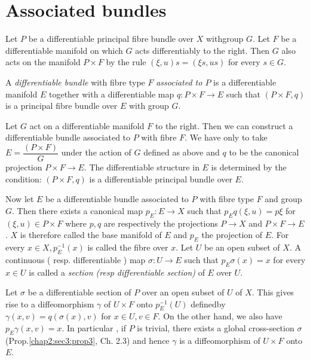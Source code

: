 \section{Associated bundles}\label{chap2:sec6}

Let $P$ be a differentiable principal fibre bundle over $X$
with\pageoriginale group 
$G$. Let $F$ be a differentiable manifold on which $G$ acts
differentiably to the right. Then $G$ also acts on the manifold $P
\times F$ by the rule $(\xi, u) s = (\xi s, us)$ for every $s \in G$.  

\begin{defn}\label{chap2:sec6:def5} %
  A {\em differentiable bundle } with fibre type $F$ {\em associated
    to $P $ } is a differentiable manifold $E$ together with a
  differentiable map $q : P \times F \to E $  such that $(P \times F,
  q)$ is a principal fibre bundle over $E$ with group $G$.  
\end{defn}

Let $G$ act on a differentiable manifold $F$ to the right. Then we can
construct a differentiable bundle associated to $P$ with fibre $F$.
We have only to take $E = \dfrac{( P \times F)} {G}$ under the action
of $G$ defined as above and $q$ to be the canonical projection $P
\times F \to E$. The differentiable structure in $E$ is determined by
the condition: $(P \times F, q) $ is a differentiable principal bundle
over $E$.  

Now let $E$ be a differentiable bundle associated to $P$ with fibre type
$F$ and group $G$. Then there exists a canonical map $p_E : E \to X$
such that $p_E q (\xi , u) = p \xi$ for $(\xi , u ) \in P \times F$
where $p, q$ are respectively the projections $P \to X$ and $P \times
F \to E$. $X$ is therefore called the base manifold of $E$ and $p_E$ the
projection of $E$. For every $x \in X, p_E^{-1}(x)$ is called the
fibre over $x$.  Let $U$ be an open subset of $X$. A continuous (
resp.  differentiable ) map $\sigma : U \to E$ such that $p_E \sigma
(x) = x$  for every $x \in U$ is called a \textit{ section (resp
  differentiable section)}  of $E$ over $U$.  

Let $\sigma$ be a differentiable section of $P$ over an open subset of
$U$ of $X$. This gives rise to a diffeomorphism $\gamma$ of $U \times
F$ onto $p_E^{-1} (U)$ defined\pageoriginale by $\gamma (x, v) = q (\sigma (x) , v)$
for $x \in U, v \in F$. On the other hand, we also have $p_E \gamma (x
, v) = x$. In particular , if $P$ is trivial, there exists a global
cross-section $\sigma$ (Prop.\ref{chap2:sec3:prop3}, Ch. 2.3) and
hence $\gamma$ is a diffeomorphism of $U \times F$ onto $E$.  

